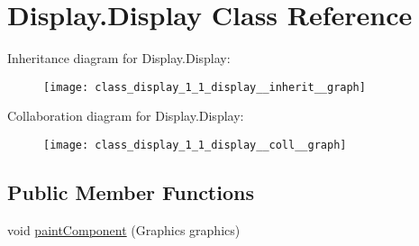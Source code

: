 \hypertarget{class_display_1_1_display}{}\section{Display.\+Display Class Reference}
\label{class_display_1_1_display}


Inheritance diagram for Display.\+Display\+:\nopagebreak
\begin{figure}[H]
\begin{center}
\leavevmode
\texttt{[image: class\_display\_1\_1\_display\_\_inherit\_\_graph]}
\end{center}
\end{figure}


Collaboration diagram for Display.\+Display\+:\nopagebreak
\begin{figure}[H]
\begin{center}
\leavevmode
\texttt{[image: class\_display\_1\_1\_display\_\_coll\_\_graph]}
\end{center}
\end{figure}
\subsection*{Public Member Functions}
\begin{DoxyCompactItemize}
\item 
void \hyperlink{class_display_1_1_display_af117c5499fbaada7683424523b9f333f}{paint\+Component} (Graphics graphics)
\end{DoxyCompactItemize}
